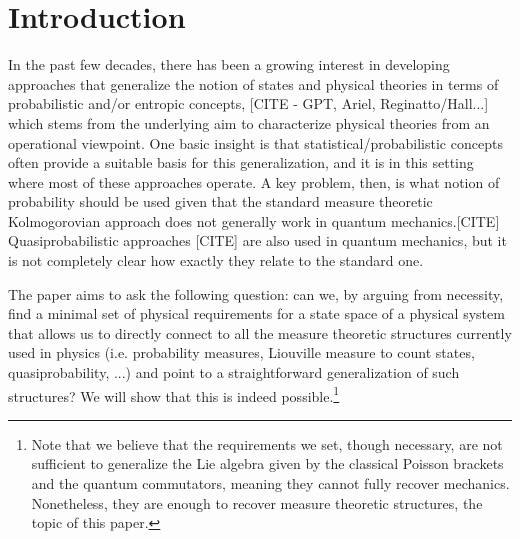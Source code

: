 \documentclass[10pt,twocolumn, nofootinbib]{revtex4-2}
\begin{document}
\section{Introduction}

In the past few decades, there has been a growing interest in developing approaches that generalize the notion of states and physical theories in terms of probabilistic and/or entropic concepts, [CITE - GPT, Ariel, Reginatto/Hall...] which stems from the underlying aim to characterize physical theories from an operational viewpoint. One basic insight is that statistical/probabilistic concepts often provide a suitable basis for this generalization, and it is in this setting where most of these approaches operate. A key problem, then, is what notion of probability should be used given that the standard measure theoretic Kolmogorovian approach does not generally work in quantum mechanics.[CITE] Quasiprobabilistic approaches [CITE] are also used in quantum mechanics, but it is not completely clear how exactly they relate to the standard one.

The paper aims to ask the following question: can we, by arguing from necessity, find a minimal set of physical requirements for a state space of a physical system that allows us to directly connect to all the measure theoretic structures currently used in physics (i.e. probability measures, Liouville measure to count states, quasiprobability, ...) and point to a straightforward generalization of such structures? We will show that this is indeed possible.\footnote{Note that we believe that the requirements we set, though necessary, are not sufficient to generalize the Lie algebra given by the classical Poisson brackets and the quantum commutators, meaning they cannot fully recover mechanics. Nonetheless, they are enough to recover measure theoretic structures, the topic of this paper.}
\end{document}
